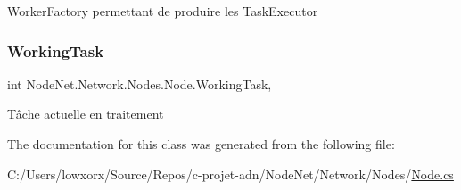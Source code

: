 Worker\+Factory permettant de produire les Task\+Executor 

\mbox{\label{class_node_net_1_1_network_1_1_nodes_1_1_node_a3394c5d0091b37680c3dc3868e369a7a}} 
\subsubsection{\texorpdfstring{Working\+Task}{WorkingTask}}
{\footnotesize\ttfamily int Node\+Net.\+Network.\+Nodes.\+Node.\+Working\+Task\hspace{0.3cm}{\ttfamily [get]}, {\ttfamily [set]}}



Tâche actuelle en traitement 



The documentation for this class was generated from the following file\+:\begin{DoxyCompactItemize}
\item 
C\+:/\+Users/lowxorx/\+Source/\+Repos/c-\/projet-\/adn/\+Node\+Net/\+Network/\+Nodes/\hyperlink{_node_8cs}{Node.\+cs}\end{DoxyCompactItemize}
